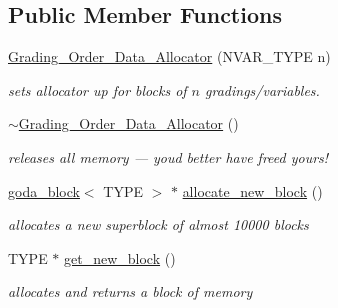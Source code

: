 \subsection*{Public Member Functions}
\begin{DoxyCompactItemize}
\item 
\mbox{\label{class_grading___order___data___allocator_aa9d14580ced0d2e3d9f0a94e8e83aa85}} 
\hyperlink{class_grading___order___data___allocator_aa9d14580ced0d2e3d9f0a94e8e83aa85}{Grading\+\_\+\+Order\+\_\+\+Data\+\_\+\+Allocator} (N\+V\+A\+R\+\_\+\+T\+Y\+PE n)
\begin{DoxyCompactList}\small\item\em sets allocator up for blocks of $n$ gradings/variables. \end{DoxyCompactList}\item 
\mbox{\label{class_grading___order___data___allocator_a01de71b688612c55185fc1fb7fd531b9}} 
\hyperlink{class_grading___order___data___allocator_a01de71b688612c55185fc1fb7fd531b9}{$\sim$\+Grading\+\_\+\+Order\+\_\+\+Data\+\_\+\+Allocator} ()
\begin{DoxyCompactList}\small\item\em releases all memory --- you\textquotesingle{}d better have freed yours! \end{DoxyCompactList}\item 
\mbox{\label{class_grading___order___data___allocator_a3ac79e785e392024b24c18d60ff3fc3c}} 
\hyperlink{uniongoda__block}{goda\+\_\+block}$<$ T\+Y\+PE $>$ $\ast$ \hyperlink{class_grading___order___data___allocator_a3ac79e785e392024b24c18d60ff3fc3c}{allocate\+\_\+new\+\_\+block} ()
\begin{DoxyCompactList}\small\item\em allocates a new superblock of almost 10000 blocks \end{DoxyCompactList}\item 
\mbox{\label{class_grading___order___data___allocator_a699e85282a021fd7b06f65b9e773eb30}} 
T\+Y\+PE $\ast$ \hyperlink{class_grading___order___data___allocator_a699e85282a021fd7b06f65b9e773eb30}{get\+\_\+new\+\_\+block} ()
\begin{DoxyCompactList}\small\item\em allocates and returns a block of memory \end{DoxyCompactList}\item 

\end{DoxyCompactItemize}
